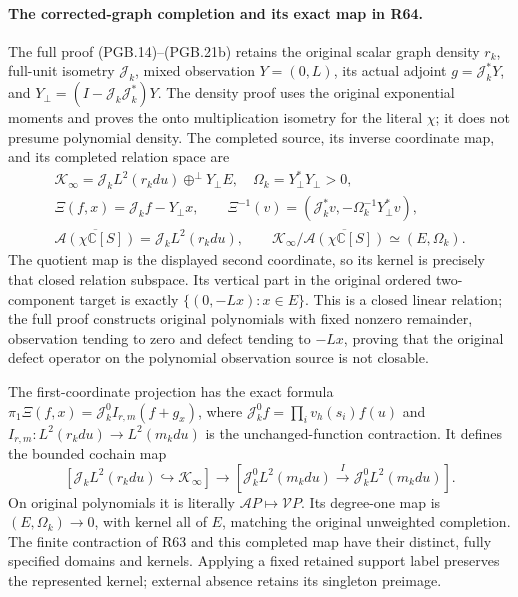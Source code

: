 \paragraph{The corrected-graph completion and its exact map in R64.}
The full proof (PGB.14)--(PGB.21b) retains the original scalar
graph density $r_k$, full-unit isometry $\mathscr J_k$,
mixed observation $Y=(0,L)$, its actual adjoint $g=\mathscr J_k^*Y$,
and $Y_\perp=(I-\mathscr J_k\mathscr J_k^*)Y$.
The density proof uses the original exponential moments and
proves the onto multiplication isometry for the literal $\chi$;
it does not presume polynomial density. The completed source,
its inverse coordinate map, and its completed relation space are
\[
 \begin{gathered}
 \mathscr K_\infty=
 \mathscr J_kL^2(r_kdu)\mathbin{\oplus^\perp}Y_\perp E,
 \quad\Omega_k=Y_\perp^*Y_\perp>0,\\
 \Xi(f,x)=\mathscr J_kf-Y_\perp x,\qquad
 \Xi^{-1}(v)=
 (\mathscr J_k^*v,-\Omega_k^{-1}Y_\perp^*v),\\
 \overline{\mathcal A(\chi\mathbb C[S])}
       =\mathscr J_kL^2(r_kdu),\qquad
 \mathscr K_\infty/\overline{\mathcal A(\chi\mathbb C[S])}
       \simeq(E,\Omega_k).
 \end{gathered}
\]
The quotient map is the displayed second coordinate, so its
kernel is precisely that closed relation subspace. Its vertical
part in the original ordered two-component target is exactly
$\{(0,-Lx):x\in E\}$. This is a closed linear relation;
the full proof constructs original polynomials with fixed
nonzero remainder, observation tending to zero and defect
tending to $-Lx$, proving that the original defect operator
on the polynomial observation source is not closable.

The first-coordinate projection has the exact formula
$\pi_1\Xi(f,x)=\mathscr J_k^0I_{r,m}(f+g_x)$, where
$\mathscr J_k^0f=\prod_i v_h(s_i)f(u)$ and
$I_{r,m}:L^2(r_kdu)\to L^2(m_kdu)$ is the unchanged-function
contraction. It defines the bounded cochain map
\[
 [\mathscr J_kL^2(r_kdu)\hookrightarrow\mathscr K_\infty]
 \longrightarrow
 [\mathscr J_k^0L^2(m_kdu)\xrightarrow{I}
                         \mathscr J_k^0L^2(m_kdu)].
\]
On original polynomials it is literally
$\mathcal AP\mapsto\mathcal VP$. Its degree-one map is
$(E,\Omega_k)\to0$, with kernel all of $E$, matching the
original unweighted completion. The finite contraction of R63
and this completed map have their distinct, fully specified
domains and kernels. Applying a fixed retained support label
preserves the represented kernel; external absence retains
its singleton preimage.


